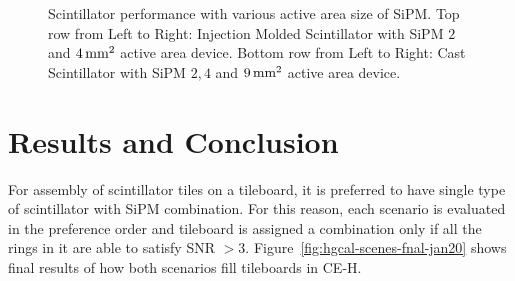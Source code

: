 \begin{figure}
  \caption[Scintillator performance with various active area size
    of \gls{SiPM}]{Scintillator performance with various active area size
    of \gls{SiPM}. Top row from Left to Right: Injection Molded
    Scintillator with \gls{SiPM} \( 2 \) and \( 4\,\text{mm}{}^2 \) active area device.
    Bottom row from Left to Right: Cast Scintillator with
    \gls{SiPM} \( 2,4 \) and \( 9\,\text{mm}{}^2 \) active area device.}%
  \label{fig:hgcal-scint-everywhere}
\end{figure}

\section{
  Results and Conclusion
 }

For assembly of scintillator tiles on a tileboard, it is preferred
to have single type of scintillator with \gls{SiPM} combination.
For this reason, each scenario is evaluated in the preference order
and tileboard is assigned a combination only
if all the rings in it are able to satisfy \gls{SNR} \( > 3\).
Figure~\ref{fig:hgcal-scenes-fnal-jan20} shows final
results of how both scenarios fill tileboards in \gls{CE-H}.

